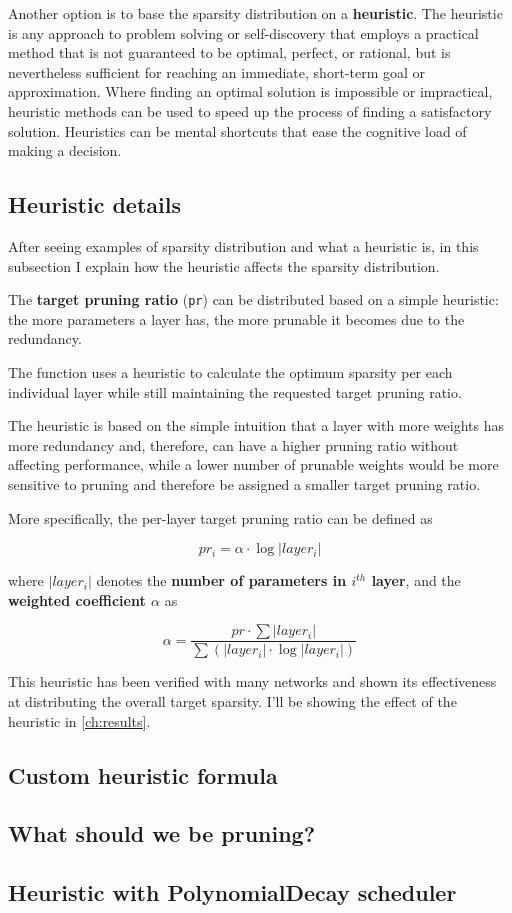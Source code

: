 Another option is to base the sparsity distribution on a \textbf{heuristic}.
The heuristic is any approach to problem solving or self-discovery that employs
a practical method that is not guaranteed to be optimal, perfect, or rational,
but is nevertheless sufficient for reaching an immediate, short-term goal or
approximation.
Where finding an optimal solution is impossible or impractical, heuristic
methods can be used to speed up the process of finding a satisfactory solution.
Heuristics can be mental shortcuts that ease the cognitive load of making a
decision.\cite{heuristic}

\subsection{Heuristic details}
After seeing examples of sparsity distribution and what a heuristic is, in this
subsection I explain how the heuristic affects the sparsity distribution.

The \textbf{target pruning ratio} (\texttt{pr}) can be distributed based on a
simple heuristic: the more parameters a layer has, the more prunable it becomes
due to the redundancy.

The function uses a heuristic to calculate the optimum sparsity per each
individual layer while still maintaining the requested target pruning ratio.

The heuristic is based on the simple intuition that a layer with more weights
has more redundancy and, therefore, can have a higher pruning ratio without
affecting performance, while a lower number of prunable weights would be more
sensitive to pruning and therefore be assigned a smaller target pruning ratio.

More specifically, the per-layer target pruning ratio can be defined as

\begin{equation}
    pr_i = \alpha \cdot \log|layer_i|
\end{equation}

where $|layer_i|$ denotes the \textbf{number of parameters in $i^{th}$ layer},
and the \textbf{weighted coefficient $\alpha$} as

\begin{equation}
    \alpha = \frac{pr \cdot \sum|layer_i|}{\sum(|layer_i| \cdot \log|layer_i|)}
\end{equation}

This heuristic has been verified with many networks and shown its effectiveness
at distributing the overall target sparsity. I'll be showing the effect of the
heuristic in \autoref{ch:results}.

\subsection{Custom heuristic formula}
\lipsum[1]

\subsection{What should we be pruning?}
\lipsum[1]

\subsection{Heuristic with PolynomialDecay scheduler}
\lipsum[1]
